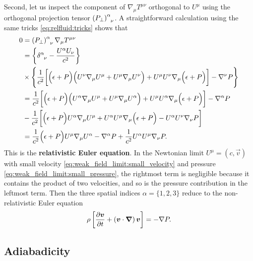 Second, let us inspect the component of $\nabla_\mu T^{\mu \nu}$ orthogonal to $U^\mu$ using the orthogonal projection tensor $\left(P_\perp\right)\indices{^\alpha_\nu}$.
A straightforward calculation using the same tricks \eqref{eq:relfluid:tricks} shows that
\begin{equation}
\begin{split}
	0 &=      \left(P_\perp\right)\indices{^\alpha_\nu} \nabla_\mu T^{\mu \nu} \\
	  &=      \left\{ \delta\indices{^\alpha_\nu} - \frac{U^\alpha U_\nu}{c^2} \right\} \\
	  &\times \Bigg \{ \frac{1}{c^2} \bigg[ \Big( \epsilon + P \Big) \Big( U^\nu \nabla_\mu U^\mu + U^\mu \nabla_\mu U^\nu \Big) + U^\mu U^\nu \nabla_\mu \Big( \epsilon + P \Big) \bigg] - \nabla^\nu P \Bigg\} \\
	  &=      \frac{1}{c^2} \bigg[ \Big( \epsilon + P \Big) \Big( U^\alpha \nabla_\mu U^\mu + U^\mu \nabla_\mu U^\alpha \Big) + U^\mu U^\alpha \nabla_\mu \Big( \epsilon + P \Big) \bigg] - \nabla^\alpha P \\
	  &-      \frac{1}{c^2} \bigg[ \Big( \epsilon + P \Big) U^\alpha \nabla_\mu U^\mu + U^\alpha U^\mu \nabla_\mu \Big( \epsilon + P \Big) - U^\alpha U^\nu \nabla_\nu P \bigg] \\
	  &=      \frac{1}{c^2} \Big( \epsilon + P \Big) U^\mu \nabla_\mu U^\alpha - \nabla^\alpha P + \frac{1}{c^2} U^\alpha U^\mu \nabla_\nu P .
\end{split}
\label{eq:relfluid:euler_equation}
\end{equation}
This is the \textbf{relativistic Euler equation}. 
In the Newtonian limit $U^\mu = (c, \vec{v})$ with small velocity \eqref{eq:weak_field_limit:small_velocity} and pressure \eqref{eq:weak_field_limit:small_pressure}, the rightmost term is negligible because it contains the product of two velocities, and so is the pressure contribution in the leftmost term.
Then the three spatial indices $\alpha = \{1, 2, 3\}$ reduce to the non-relativistic Euler equation
\begin{equation}
	\rho \left[ \pdv{{\bm{v}}}{t} + \left( {\bm{v}} \cdot {\bm{\nabla}} \right) {\bm{v}} \right] = -\nabla P .
\end{equation}


\subsection{Adiabadicity}
\label{sec:relfluid:adiabadicity}

